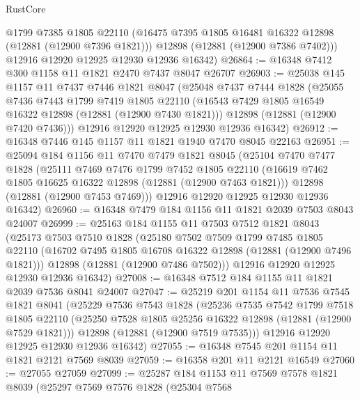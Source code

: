 \begin{lexlean}{RustCore}
\begin{coremodule}
        @1799
        @7385
        @1805
        @22110
        (@16475 @7395 @1805 @16481 @16322 @12898 (@12881 (@12900 @7396 @1821)))
        @12898
        (@12881 (@12900 @7386 @7402)))
      @12916
      @12920
      @12925
      @12930
      @12936
      @16342)
@26864 := @16348 @7412 @300 @1158 @11 @1821 @2470 @7437 @8047 @26707
@26903 := @25038
    @145
    @1157
    @11
    @7437
    @7446
    @1821
    @8047
    (@25048
      @7437
      @7444
      @1828
      (@25055
        @7436
        @7443
        @1799
        @7419
        @1805
        @22110
        (@16543 @7429 @1805 @16549 @16322 @12898 (@12881 (@12900 @7430 @1821)))
        @12898
        (@12881 (@12900 @7420 @7436)))
      @12916
      @12920
      @12925
      @12930
      @12936
      @16342)
@26912 := @16348 @7446 @145 @1157 @11 @1821 @1940 @7470 @8045 @22163
@26951 := @25094
    @184
    @1156
    @11
    @7470
    @7479
    @1821
    @8045
    (@25104
      @7470
      @7477
      @1828
      (@25111
        @7469
        @7476
        @1799
        @7452
        @1805
        @22110
        (@16619 @7462 @1805 @16625 @16322 @12898 (@12881 (@12900 @7463 @1821)))
        @12898
        (@12881 (@12900 @7453 @7469)))
      @12916
      @12920
      @12925
      @12930
      @12936
      @16342)
@26960 := @16348 @7479 @184 @1156 @11 @1821 @2039 @7503 @8043 @24007
@26999 := @25163
    @184
    @1155
    @11
    @7503
    @7512
    @1821
    @8043
    (@25173
      @7503
      @7510
      @1828
      (@25180
        @7502
        @7509
        @1799
        @7485
        @1805
        @22110
        (@16702 @7495 @1805 @16708 @16322 @12898 (@12881 (@12900 @7496 @1821)))
        @12898
        (@12881 (@12900 @7486 @7502)))
      @12916
      @12920
      @12925
      @12930
      @12936
      @16342)
@27008 := @16348 @7512 @184 @1155 @11 @1821 @2039 @7536 @8041 @24007
@27047 := @25219
    @201
    @1154
    @11
    @7536
    @7545
    @1821
    @8041
    (@25229
      @7536
      @7543
      @1828
      (@25236
        @7535
        @7542
        @1799
        @7518
        @1805
        @22110
        (@25250 @7528 @1805 @25256 @16322 @12898 (@12881 (@12900 @7529 @1821)))
        @12898
        (@12881 (@12900 @7519 @7535)))
      @12916
      @12920
      @12925
      @12930
      @12936
      @16342)
@27055 := @16348 @7545 @201 @1154 @11 @1821 @2121 @7569 @8039
@27059 := @16358 @201 @11 @2121 @16549
@27060 := @27055 @27059
@27099 := @25287
    @184
    @1153
    @11
    @7569
    @7578
    @1821
    @8039
    (@25297
      @7569
      @7576
      @1828
      (@25304
        @7568

\end{coremodule}
\end{lexlean}
